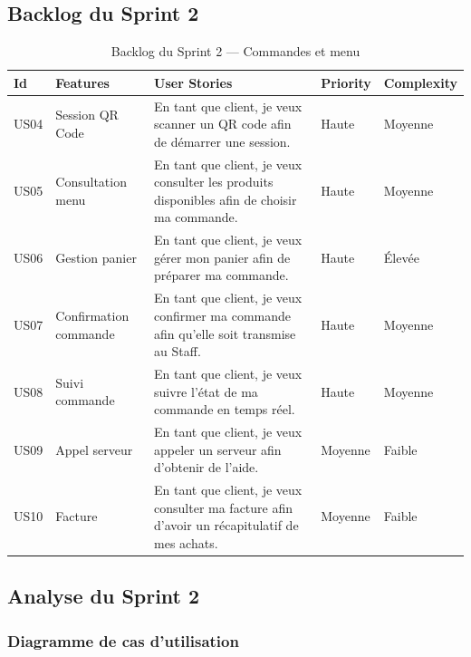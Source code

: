 \subsection{Backlog du Sprint 2}

\begin{table}[H]
\centering
\caption{Backlog du Sprint 2 — Commandes et menu}
\renewcommand{\arraystretch}{1.3}
\small
\begin{tabular}{|p{1cm}|p{2.7cm}|p{6.5cm}|p{1.5cm}|p{2cm}|}
\hline
\textbf{Id} & \textbf{Features} & \textbf{User Stories} & \textbf{Priority} & \textbf{Complexity} \\
\hline
US04 & Session QR Code & En tant que client, je veux scanner un QR code afin de démarrer une session. & Haute & Moyenne \\
\hline
US05 & Consultation menu & En tant que client, je veux consulter les produits disponibles afin de choisir ma commande. & Haute & Moyenne \\
\hline
US06 & Gestion panier & En tant que client, je veux gérer mon panier afin de préparer ma commande. & Haute & Élevée \\
\hline
US07 & Confirmation commande & En tant que client, je veux confirmer ma commande afin qu'elle soit transmise au Staff. & Haute & Moyenne \\
\hline
US08 & Suivi commande & En tant que client, je veux suivre l'état de ma commande en temps réel. & Haute & Moyenne \\
\hline
US09 & Appel serveur & En tant que client, je veux appeler un serveur afin d'obtenir de l'aide. & Moyenne & Faible \\
\hline
US10 & Facture & En tant que client, je veux consulter ma facture afin d'avoir un récapitulatif de mes achats. & Moyenne & Faible \\
\hline
\end{tabular}
\end{table}

\subsection{Analyse du Sprint 2}

\subsubsection{Diagramme de cas d'utilisation}

